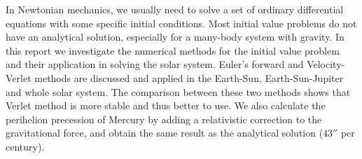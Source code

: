 In Newtonian mechanics, we usually need to solve a set of ordinary differential equations with some specific initial conditions. 
Most initial value problems do not have an analytical solution, especially for a many-body system with gravity. 
In this report we investigate the numerical methods for the initial value problem and their application in solving the solar system. 
Euler's forward and Velocity-Verlet methods are discussed and applied in the Earth-Sun, Earth-Sun-Jupiter and whole solar system. 
The comparison between these two methods shows that Verlet method is more stable and thus better to use. 
We also calculate the perihelion precession of Mercury by adding a relativistic correction to the gravitational force, 
and obtain the same result as the analytical solution ($43''$ per century). 